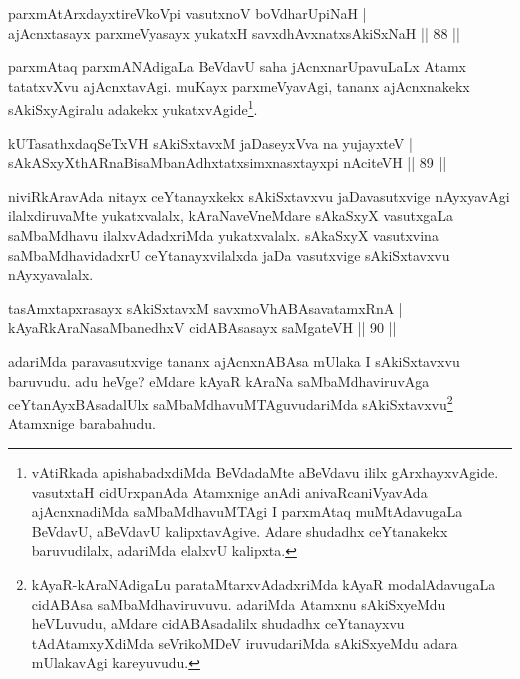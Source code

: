 \begin{shl}
parxmAtArxdayxtireVkoV\s pi vasutxnoV boVdharUpiNaH |\\
ajAcnxtasayx parxmeVyasayx yukatxH savxdhAvxnatxsAkiSxNaH \hfill || 88 ||
\end{shl}

\begin{artha}%
parxmAtaq parxmANAdigaLa BeVdavU saha jAcnxnarUpavuLaLx Atamx tatatxvXvu ajAcnxtavAgi. muKayx parxmeVyavAgi, tananx ajAcnxnakekx sAkiSxyAgiralu adakekx yukatxvAgide\footnote[1]{vAtiRkada apishabadxdiMda BeVdadaMte aBeVdavu ililx gArxhayxvAgide. vasutxtaH cidUrxpanAda Atamxnige anAdi anivaRcaniVyavAda ajAcnxnadiMda saMbaMdhavuMTAgi I parxmAtaq muMtAdavugaLa BeVdavU, aBeVdavU kalipxtavAgive. Adare shudadhx ceYtanakekx baruvudilalx, adariMda elalxvU kalipxta.}.
\end{artha}


\begin{shl}
kUTasathxdaqSeTxVH sAkiSxtavxM jaDaseyxVva na yujayxteV |\\
sAkASxyXthARnaBisaMbanAdhxtatxsimxnasxtayxpi nAciteVH \hfill || 89 ||
\end{shl}

\begin{artha}
niviRkAravAda nitayx ceYtanayxkekx sAkiSxtavxvu jaDavasutxvige nAyxyavAgi ilalxdiruvaMte yukatxvalalx, kAraNaveVneMdare sAkaSxyX vasutxgaLa saMbaMdhavu ilalxvAdadxriMda yukatxvalalx. sAkaSxyX vasutxvina saMbaMdhavidadxrU ceYtanayxvilalxda jaDa vasutxvige sAkiSxtavxvu nAyxyavalalx.
\end{artha}


\begin{shl}
tasAmxtapxrasayx sAkiSxtavxM savxmoVhABAsavatamxRnA |\\
kAyaRkAraNasaMbanedhxV cidABAsasayx saMgateVH \hfill || 90 ||
\end{shl}

\begin{artha}
adariMda paravasutxvige tananx ajAcnxnABAsa mUlaka I sAkiSxtavxvu baruvudu. adu heVge? eMdare kAyaR kAraNa saMbaMdhaviruvAga ceYtanAyxBAsadalUlx saMbaMdhavuMTAguvudariMda sAkiSxtavxvu\footnote[2]{kAyaR-kAraNAdigaLu parataMtarxvAdadxriMda kAyaR modalAdavugaLa cidABAsa saMbaMdhaviruvuvu. adariMda Atamxnu sAkiSxyeMdu heVLuvudu, aMdare cidABAsadalilx shudadhx ceYtanayxvu tAdAtamxyXdiMda seVrikoMDeV iruvudariMda sAkiSxyeMdu adara mUlakavAgi kareyuvudu.} Atamxnige barabahudu.
\end{artha}

